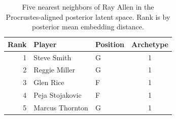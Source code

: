 \begin{table}[htbp]
  \centering\small
  \begin{tabular}{rllc}
    \toprule
    Rank & Player & Position & Archetype \\
    \midrule
    1 & Steve Smith & G & 1 \\
    2 & Reggie Miller & G & 1 \\
    3 & Glen Rice & F & 1 \\
    4 & Peja Stojakovic & F & 1 \\
    5 & Marcus Thornton & G & 1 \\
    \bottomrule
  \end{tabular}
  \caption{Five nearest neighbors of Ray Allen in the Procrustes-aligned posterior latent space. Rank is by posterior mean embedding distance.}
  \label{tab:Ray_Allen_neighbors}
\end{table}

